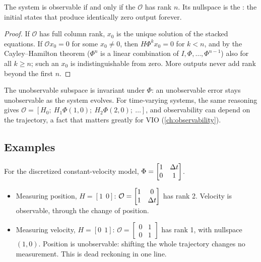 \begin{theorem}
\label{thm:obs-rank}
The system is observable if and only if the  $\mathcal O$ has rank $n$. Its nullspace is the : the
initial states that produce identically zero output forever.
\end{theorem}
\begin{proof}
If $\mathcal O$ has full column rank, $x_0$ is the unique solution of the stacked equations. If $\mathcal Ox_0 = 0$ for some $x_0 \ne 0$, then $H\Phi^kx_0 = 0$ for
$k < n$, and by the Cayley--Hamilton theorem ($\Phi^n$ is a linear combination of $I, \Phi, \dots, \Phi^{n-1}$) also for all $k \ge n$; such an $x_0$ is
indistinguishable from zero. More outputs never add rank beyond the first $n$.
\end{proof}

The unobservable subspace is invariant under $\Phi$: an unobservable error stays unobservable as the system evolves. For time-varying systems, the
same reasoning gives $\mathcal O = [H_0;\ H_1\Phi(1, 0);\ H_2\Phi(2, 0);\ \dots]$, and observability can depend on the trajectory, a fact that matters
greatly for VIO (\cref{ch:observability}).

\subsection{Examples}

\begin{example}
For the discretized constant-velocity model, $\Phi = \begin{bmatrix}1 & {\Delta t}\\0 & 1\end{bmatrix}$.
\begin{itemize}
  \item Measuring position, $H = [1\ \ 0]$: $\mathcal O = \begin{bmatrix}1 & 0\\1 & {\Delta t}\end{bmatrix}$ has rank 2. Velocity is observable, through the change of position.
  \item Measuring velocity, $H = [0\ \ 1]$: $\mathcal O = \begin{bmatrix}0 & 1\\0 & 1\end{bmatrix}$ has rank 1, with nullspace $(1, 0)$. Position is unobservable: shifting the whole
        trajectory changes no measurement. This is dead reckoning in one line.
\end{itemize}
\end{example}


